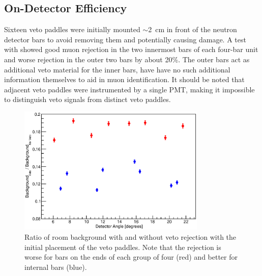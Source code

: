 \subsection{On-Detector Efficiency}

Sixteen veto paddles were initially mounted $\sim$2~cm in front of the neutron detector bars to avoid removing them and potentially causing damage.  A test with \MgReaction showed good muon rejection in the two innermost bars of each four-bar unit and worse rejection in the outer two bars by about 20\%.  The outer bars act as additional veto material for the inner bars, have have no such additional information themselves to aid in muon identification.  It should be noted that adjacent veto paddles were instrumented by a single PMT, making it impossible to distinguish veto signals from distinct veto paddles.  
\begin{figure}[!htbp]
\centering
\includegraphics[width=0.8\textwidth]{figures/bkgdRejection_old.eps}
\caption{Ratio of room background with and without veto rejection with the initial placement of the veto paddles.  Note that the rejection is worse for bars on the ends of each group of four (red) and better for internal bars (blue).}
\label{fig:initialBackground}
\end{figure}


